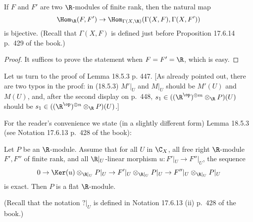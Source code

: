 \documentclass[12pt]{article}
\theoremstyle{remark}
\theoremstyle{definition}
\begin{document}
\begin{lem}
If $F$ and $F'$ are two $\R$-modules of finite rank, then the natural map
$$
\Hom_\R(F,F')\to\Hom_{\Gamma(X,\R)}(\Gamma(X,F),\Gamma(X,F'))
$$ 
is bijective. (Recall that $\Gamma(X,F)$ is defined just before Proposition 17.6.14 p.~429 of the book.)
\end{lem}
\begin{proof}
It suffices to prove the statement when $F=F'=\R$, which is easy.
\end{proof}

Let us turn to the proof of Lemma 18.5.3 p. 447. [As already pointed out, there are two typos in the proof: in (18.5.3) $M'|_U$ and $M|_U$ should be $M'(U)$ and $M(U)$, and, after the second display on p.~448, $s_1\in((\R^{\op})^{\oplus m}\otimes_\R P)(U)$ should be $s_1\in((\R^{\op})^{\oplus n}\otimes_\R P)(U)$.] 

For the reader's convenience we state (in a slightly different form) Lemma 18.5.3 (see Notation 17.6.13 p.~428 of the book): 

\begin{lem}[Lemma 18.5.3 p. 447]
Let $P$ be an $\R$-module. Assume that for all $U$ in $\C_X$, all free right $\R$-module $F',F''$ of finite rank, and all $\R|_U$-linear morphism $u:F'|_U\to F''|_U$, the sequence 
$$
0\to\Ker(u)\otimes_{\R|_U}P|_U\to F'|_U\otimes_{\R|_U}P|_U\to F''|_U\otimes_{\R|_U}P|_U
$$ 
is exact. Then $P$ is a flat $\R$-module.
\end{lem} 

(Recall that the notation $?|_U$ is defined in Notation 17.6.13 (ii) p.~428 of the book.)
\end{document}
